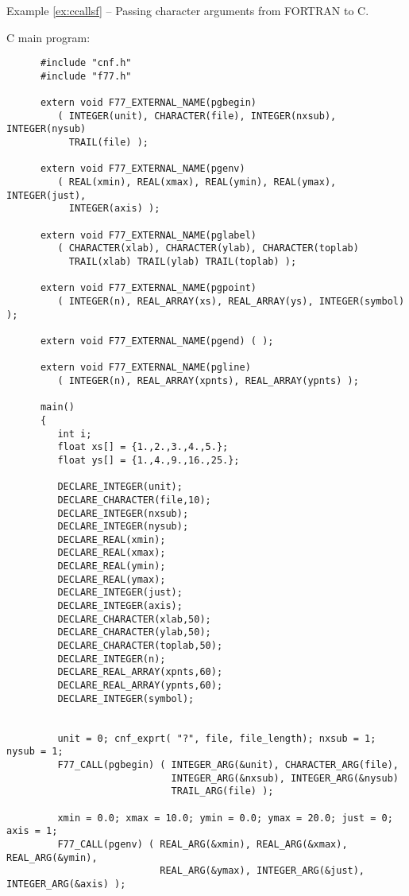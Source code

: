 \label{ex:ccallsf}
\begin{center}
Example \ref{ex:ccallsf} -- Passing character arguments from FORTRAN to C.
\end{center}
\nopagebreak[4]
C main program:
{\small \begin{verbatim}
      #include "cnf.h"
      #include "f77.h"

      extern void F77_EXTERNAL_NAME(pgbegin)
         ( INTEGER(unit), CHARACTER(file), INTEGER(nxsub), INTEGER(nysub)
           TRAIL(file) );
     
      extern void F77_EXTERNAL_NAME(pgenv)
         ( REAL(xmin), REAL(xmax), REAL(ymin), REAL(ymax), INTEGER(just),
           INTEGER(axis) );

      extern void F77_EXTERNAL_NAME(pglabel)
         ( CHARACTER(xlab), CHARACTER(ylab), CHARACTER(toplab)
           TRAIL(xlab) TRAIL(ylab) TRAIL(toplab) );

      extern void F77_EXTERNAL_NAME(pgpoint)
         ( INTEGER(n), REAL_ARRAY(xs), REAL_ARRAY(ys), INTEGER(symbol) );

      extern void F77_EXTERNAL_NAME(pgend) ( );

      extern void F77_EXTERNAL_NAME(pgline)
         ( INTEGER(n), REAL_ARRAY(xpnts), REAL_ARRAY(ypnts) );

      main()
      {
         int i;
         float xs[] = {1.,2.,3.,4.,5.};
         float ys[] = {1.,4.,9.,16.,25.};

         DECLARE_INTEGER(unit);
         DECLARE_CHARACTER(file,10);
         DECLARE_INTEGER(nxsub);
         DECLARE_INTEGER(nysub);
         DECLARE_REAL(xmin);
         DECLARE_REAL(xmax);
         DECLARE_REAL(ymin);
         DECLARE_REAL(ymax);
         DECLARE_INTEGER(just);
         DECLARE_INTEGER(axis);
         DECLARE_CHARACTER(xlab,50);
         DECLARE_CHARACTER(ylab,50);
         DECLARE_CHARACTER(toplab,50);
         DECLARE_INTEGER(n);
         DECLARE_REAL_ARRAY(xpnts,60);
         DECLARE_REAL_ARRAY(ypnts,60);
         DECLARE_INTEGER(symbol);


         unit = 0; cnf_exprt( "?", file, file_length); nxsub = 1; nysub = 1;
         F77_CALL(pgbegin) ( INTEGER_ARG(&unit), CHARACTER_ARG(file), 
                             INTEGER_ARG(&nxsub), INTEGER_ARG(&nysub)
                             TRAIL_ARG(file) );

         xmin = 0.0; xmax = 10.0; ymin = 0.0; ymax = 20.0; just = 0; axis = 1;
         F77_CALL(pgenv) ( REAL_ARG(&xmin), REAL_ARG(&xmax), REAL_ARG(&ymin),
                           REAL_ARG(&ymax), INTEGER_ARG(&just), INTEGER_ARG(&axis) );


\end{verbatim}}

